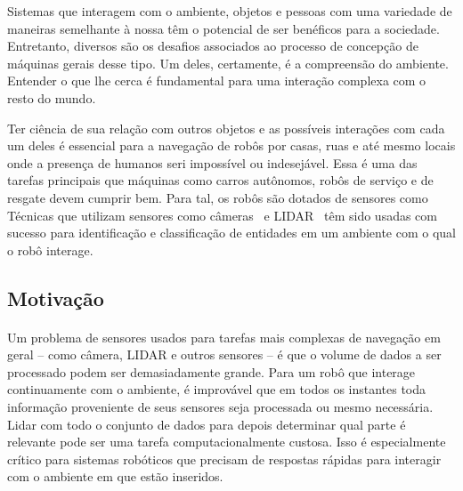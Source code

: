\documentclass[11pt]{article}
\begin{document}
Sistemas que interagem com o ambiente, objetos e pessoas 
com uma variedade de maneiras semelhante à nossa têm o potencial de ser 
benéficos para a sociedade. 
Entretanto, diversos são os desafios associados ao processo de concepção de 
máquinas gerais desse tipo. 
Um deles, certamente, é a compreensão do ambiente. 
Entender o que lhe cerca é fundamental para uma interação complexa com o resto
do mundo. 

Ter ciência de sua relação com outros objetos e 
as possíveis interações com cada um deles é essencial para a navegação 
de robôs por casas, ruas e até mesmo locais onde a presença de humanos seri impossível ou indesejável.
Essa é uma das tarefas principais que máquinas como carros autônomos, 
robôs de serviço \cite{ifr} e de resgate devem cumprir bem. Para tal, os robôs são dotados de sensores como
Técnicas que utilizam sensores como câmeras~\cite{vision} e LIDAR~\cite{car} 
têm sido usadas com sucesso para identificação e classificação de entidades 
em um ambiente com o qual o robô interage. 

\subsection{Motivação}
\paragraph{}
Um problema de sensores usados para tarefas mais complexas de navegação
em geral -- como câmera, LIDAR e outros sensores --
é que o volume de dados a ser processado podem ser demasiadamente grande. 
Para um robô que interage continuamente com o ambiente, é improvável que em todos os instantes  
toda informação proveniente de seus sensores seja processada ou mesmo necessária. 
Lidar com todo o conjunto de dados para depois determinar qual parte é 
relevante pode ser uma tarefa  computacionalmente custosa. 
Isso é especialmente crítico para sistemas robóticos que precisam de respostas
rápidas para interagir com o ambiente em que estão inseridos. 
\end{document}
